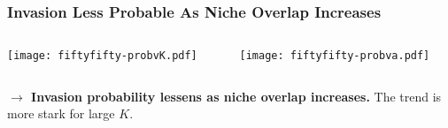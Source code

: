 \documentclass[dvipsnames]{beamer}
\begin{document}
\begin{frame}
\frametitle{Invasion Less Probable As Niche Overlap Increases}
\begin{columns}
	\begin{column}{5.5cm}
		\begin{center}
			\texttt{[image: fiftyfifty-probvK.pdf]}
		\end{center}
	\end{column}
	\begin{column}{5.5cm}
		\begin{center}
			\texttt{[image: fiftyfifty-probva.pdf]}
		\end{center}
	\end{column}
\end{columns}
\vspace{0.2cm}
\justifying
	\textbf{$\rightarrow$ Invasion probability lessens as niche overlap increases.} The trend is more stark for large $K$. %
\end{frame}
\end{document}
